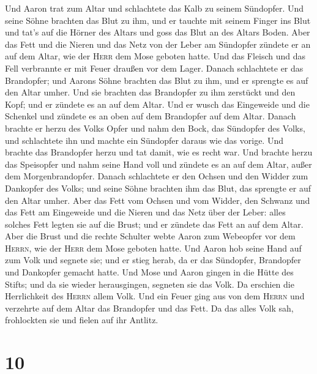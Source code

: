  Und Aaron trat zum Altar und schlachtete das Kalb zu
seinem Sündopfer.  Und seine Söhne brachten das Blut zu
ihm, und er tauchte mit seinem Finger ins Blut und tat's auf die Hörner
des Altars und goss das Blut an des Altars Boden.  Aber
das Fett und die Nieren und das Netz von der Leber am Sündopfer zündete
er an auf dem Altar, wie der \textsc{Herr} dem Mose geboten hatte.
 Und das Fleisch und das Fell verbrannte er mit Feuer
draußen vor dem Lager.  Danach schlachtete er das
Brandopfer; und Aarons Söhne brachten das Blut zu ihm, und er sprengte
es auf den Altar umher.  Und sie brachten das Brandopfer
zu ihm zerstückt und den Kopf; und er zündete es an auf dem Altar.
 Und er wusch das Eingeweide und die Schenkel und zündete
es an oben auf dem Brandopfer auf dem Altar.  Danach
brachte er herzu des Volks Opfer und nahm den Bock, das Sündopfer des
Volks, und schlachtete ihn und machte ein Sündopfer daraus wie das
vorige.  Und brachte das Brandopfer herzu und tat damit,
wie es recht war.  Und brachte herzu das Speisopfer und
nahm seine Hand voll und zündete es an auf dem Altar, außer dem
Morgenbrandopfer.  Danach schlachtete er den Ochsen und
den Widder zum Dankopfer des Volks; und seine Söhne brachten ihm das
Blut, das sprengte er auf den Altar umher.  Aber das Fett
vom Ochsen und vom Widder, den Schwanz und das Fett am Eingeweide und
die Nieren und das Netz über der Leber:  alles solches
Fett legten sie auf die Brust; und er zündete das Fett an auf dem Altar.
 Aber die Brust und die rechte Schulter webte Aaron zum
Webeopfer vor dem \textsc{Herrn}, wie der \textsc{Herr} dem Mose geboten
hatte.  Und Aaron hob seine Hand auf zum Volk und segnete
sie; und er stieg herab, da er das Sündopfer, Brandopfer und Dankopfer
gemacht hatte.  Und Mose und Aaron gingen in die Hütte
des Stifts; und da sie wieder herausgingen, segneten sie das Volk. Da
erschien die Herrlichkeit des \textsc{Herrn} allem Volk. 
Und ein Feuer ging aus von dem \textsc{Herrn} und verzehrte auf dem
Altar das Brandopfer und das Fett. Da das alles Volk sah, frohlockten
sie und fielen auf ihr Antlitz.

\hypertarget{section-9}{%
\section{10}\label{section-9}}

